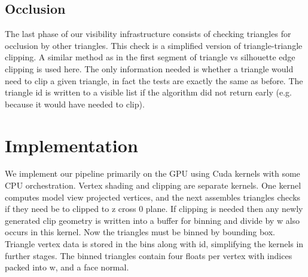 \documentclass[review]{acmsiggraph}
\begin{document}
\subsection{Occlusion}

	The last phase of our visibility infrastructure consists of checking triangles for occlusion by other triangles. This check is a simplified version of triangle-triangle clipping. A similar method as in the first segment of triangle vs silhouette edge clipping is used here. The only information needed is whether a triangle would need to clip a given triangle, in fact the tests are exactly the same as before. The triangle id is written to a visible list if the algorithm did not return early (e.g. because it would have needed to clip).

\section{Implementation}
We implement our pipeline primarily on the GPU using Cuda kernels with some CPU orchestration. Vertex shading and clipping are separate kernels. One kernel computes model view projected vertices, and the next assembles triangles checks if they need be to clipped to z cross 0 plane. If clipping is needed then any newly generated clip geometry is written into a buffer for binning and divide by w also occurs in this kernel. Now the triangles must be binned by bounding box. Triangle vertex data is stored in the bins along with id, simplifying the kernels in further stages. The binned triangles contain four floats per vertex with indices packed into w, and a face normal.
\end{document}

